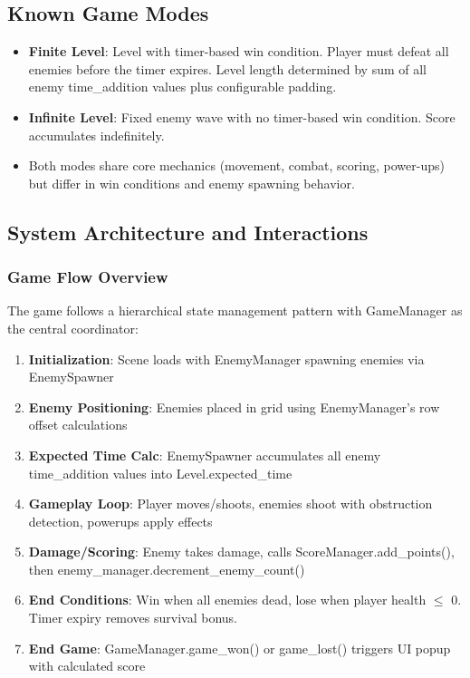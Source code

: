 \documentclass{article}
\begin{document}
\subsection{Known Game Modes}

\begin{itemize}
    \item \textbf{Finite Level}: Level with timer-based win condition. Player must defeat all enemies before the timer expires. Level length determined by sum of all enemy time\_addition values plus configurable padding.
    \item \textbf{Infinite Level}: Fixed enemy wave with no timer-based win condition. Score accumulates indefinitely.
    \item Both modes share core mechanics (movement, combat, scoring, power-ups) but differ in win conditions and enemy spawning behavior.
\end{itemize}

\subsection{System Architecture and Interactions}

\subsubsection{Game Flow Overview}

The game follows a hierarchical state management pattern with GameManager as the central coordinator:

\begin{enumerate}
    \item \textbf{Initialization}: Scene loads with EnemyManager spawning enemies via EnemySpawner
    \item \textbf{Enemy Positioning}: Enemies placed in grid using EnemyManager's row offset calculations
    \item \textbf{Expected Time Calc}: EnemySpawner accumulates all enemy time\_addition values into Level.expected\_time
    \item \textbf{Gameplay Loop}: Player moves/shoots, enemies shoot with obstruction detection, powerups apply effects
    \item \textbf{Damage/Scoring}: Enemy takes damage, calls ScoreManager.add\_points(), then enemy\_manager.decrement\_enemy\_count()
    \item \textbf{End Conditions}: Win when all enemies dead, lose when player health $\leq$ 0. Timer expiry removes survival bonus.
    \item \textbf{End Game}: GameManager.game\_won() or game\_lost() triggers UI popup with calculated score
\end{enumerate}
\end{document}
